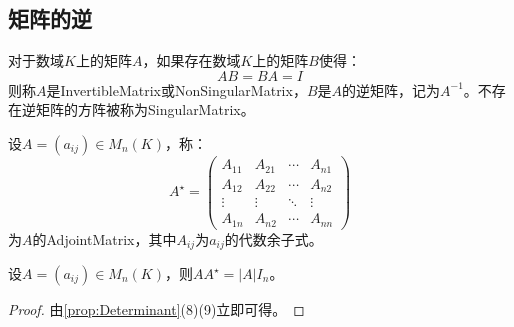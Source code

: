 \subsection{矩阵的逆}
\begin{definition}
	对于数域$K$上的矩阵$A$，如果存在数域$K$上的矩阵$B$使得：
	\begin{equation*}
		AB=BA=I
	\end{equation*}
	则称$A$是\gls{InvertibleMatrix}或\gls{NonSingularMatrix}，$B$是$A$的逆矩阵，记为$A^{-1}$。不存在逆矩阵的方阵被称为\gls{SingularMatrix}。
\end{definition}
\begin{definition}
	设$A=(a_{ij})\in M_{n}(K)$，称：
	\begin{equation*}
		A^{\star}=
		\begin{pmatrix}
			A_{11} & A_{21} & \cdots & A_{n1} \\
			A_{12} & A_{22} & \cdots & A_{n2} \\
			\vdots & \vdots & \ddots &\vdots \\
			A_{1n} & A_{n2} & \cdots & A_{nn} 
		\end{pmatrix}
	\end{equation*}
	为$A$的\gls{AdjointMatrix}，其中$A_{ij}$为$a_{ij}$的代数余子式。
\end{definition}
\begin{property}\label{prop:AdjointMatrix}
	设$A=(a_{ij})\in M_{n}(K)$，则$AA^{\star}=|A|I_n$。
\end{property}
\begin{proof}
	由\cref{prop:Determinant}(8)(9)立即可得。
\end{proof}
